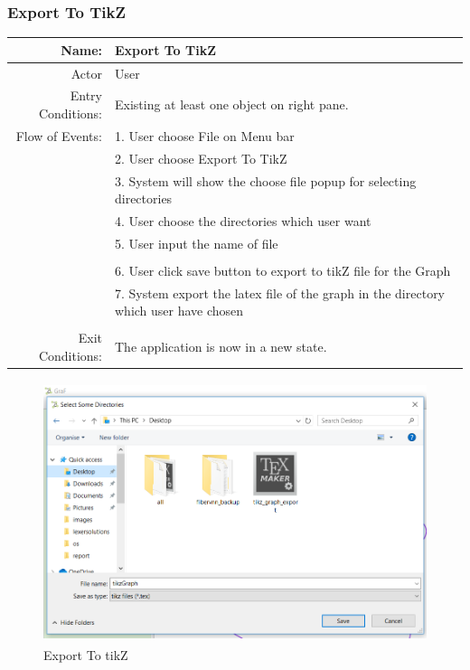 \documentclass[a4paper,10pt]{article}
\begin{document}
\subsubsection{Export To TikZ}
	\begin{tabular}{|r|l|}
\hline
Name: & Export To TikZ \\
\hline
Actor & User \\
\hline
Entry Conditions: & Existing at least one object on right pane. \\
\hline
Flow of Events: & 1. User choose File on Menu bar \\
& 2. User choose Export To TikZ  \\
& 3. System will show the choose file popup for selecting directories \\
& 4. User choose the directories which user want\\
& 5. User input the name of file\\
\\
& 6. User click save button to export to tikZ file for the Graph\\
& 7. System export the latex file of the graph in the directory which user have chosen\\
\\
\hline
Exit Conditions: & The application is now in a new state. \\
\hline

\end{tabular}
\begin{figure}[H]
		\centering
		\includegraphics[height = 3in]{tikzFunc1.png}
		\caption[Optional caption]{Export To tikZ}
		\label{fig:Repository}
	\end{figure}
\end{document}
